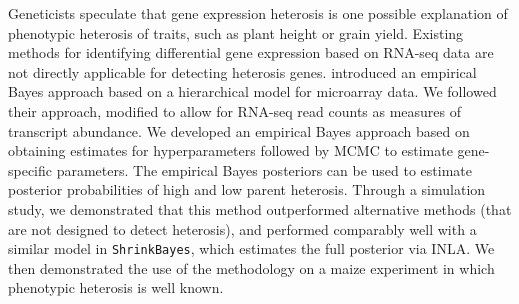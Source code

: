\documentclass[useAMS,usenatbib,referee]{biom}
\newcommand{\ShrinkBayes}{{\tt ShrinkBayes}}
\newcommand{\RNAseq}{RNA-seq}
\begin{document}
Geneticists speculate that gene expression heterosis is one possible explanation of phenotypic heterosis of traits, such as plant height or grain yield. Existing methods for identifying differential gene expression based on \RNAseq{} data are not directly applicable for detecting heterosis genes. \cite{ji2014estimation} introduced an empirical Bayes approach based on a hierarchical model for microarray data. We followed their approach, modified to allow for \RNAseq{} read counts as measures of transcript abundance. We developed an empirical Bayes approach based on obtaining estimates for hyperparameters followed by MCMC to estimate gene-specific parameters. The empirical Bayes posteriors can be used to estimate posterior probabilities of high and low parent heterosis. Through a simulation study, we demonstrated that this method outperformed alternative methods (that are not designed to detect heterosis), and performed comparably well with a similar model in \ShrinkBayes{}, which estimates the full posterior via INLA. We then demonstrated the use of the methodology on a maize experiment in which phenotypic heterosis is well known. 
\end{document}
